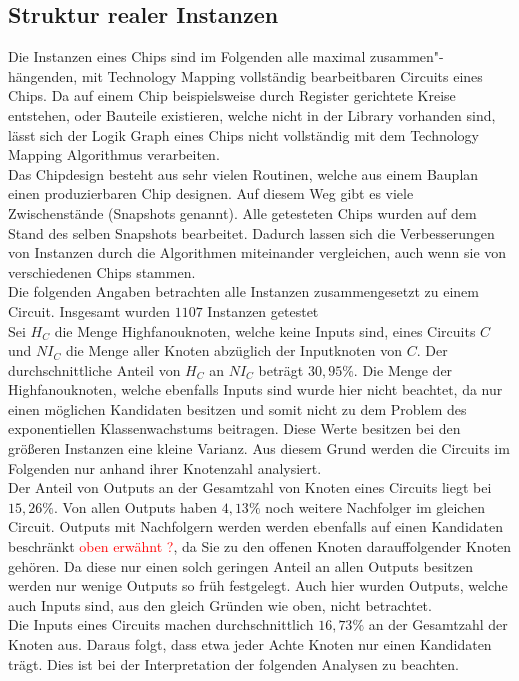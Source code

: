 \documentclass[11pt, a4paper, german]{article}
\newcommand{\TM}{Technology  Mapping }
\begin{document}
 \subsection{Struktur realer Instanzen}
\label{subsec:struktur_realer_instanzen} 
 Die Instanzen eines Chips sind im Folgenden alle maximal zusammen"-h\"angen\-den, mit \TM vollständig bearbeitbaren Circuits eines Chips. Da auf einem Chip beispielsweise durch Register gerichtete Kreise entstehen, oder Bauteile existieren, welche nicht in der Library vorhanden sind, lässt sich der Logik Graph eines Chips nicht vollständig mit dem \TM Algorithmus verarbeiten. \\
 Das Chipdesign besteht aus sehr vielen Routinen, welche aus einem Bauplan einen produzierbaren Chip designen. Auf diesem Weg gibt es viele Zwischenstände (Snapshots genannt). Alle getesteten Chips wurden auf dem Stand  des selben Snapshots bearbeitet. Dadurch lassen sich die Verbesserungen von Instanzen durch die Algorithmen miteinander vergleichen, auch wenn sie von verschiedenen Chips stammen.\\
 Die folgenden Angaben betrachten alle Instanzen zusammengesetzt zu einem Circuit.
 Insgesamt wurden $1107$ Instanzen getestet \\
 Sei $H_C$ die Menge Highfanouknoten, welche keine Inputs sind, eines Circuits $C$ und $NI_C$ die Menge aller Knoten abz\"uglich der Inputknoten von $C$. Der durchschnittliche Anteil von $H_C$ an $NI_C$ betr\"agt $30,95\%$. Die Menge der Highfanouknoten, welche ebenfalls Inputs sind wurde hier nicht beachtet, da nur einen m\"oglichen Kandidaten besitzen und somit nicht zu dem Problem des exponentiellen Klassenwachstums beitragen. Diese Werte besitzen bei den gr\"o{\ss}eren Instanzen eine kleine Varianz. Aus diesem Grund werden die Circuits im Folgenden nur anhand ihrer Knotenzahl analysiert.\\
 Der Anteil von Outputs an der Gesamtzahl von Knoten eines Circuits liegt bei $15,26\%$. Von allen Outputs haben $4,13\%$ noch weitere Nachfolger im gleichen Circuit. Outputs mit Nachfolgern werden werden ebenfalls auf einen Kandidaten beschr\"ankt \textcolor{red}{oben erw\"ahnt ?}, da Sie zu den offenen Knoten darauffolgender Knoten gehören. Da diese nur einen solch geringen Anteil an allen Outputs besitzen werden nur wenige Outputs so fr\"uh festgelegt. Auch hier wurden Outputs, welche auch Inputs sind, aus den gleich Gr\"unden wie oben, nicht betrachtet.\\
 Die Inputs eines Circuits machen durchschnittlich $16,73\%$ an der Gesamtzahl der Knoten aus. Daraus folgt, dass etwa jeder Achte Knoten nur einen Kandidaten tr\"agt. Dies ist bei der Interpretation der folgenden Analysen zu beachten.\\
\end{document}
